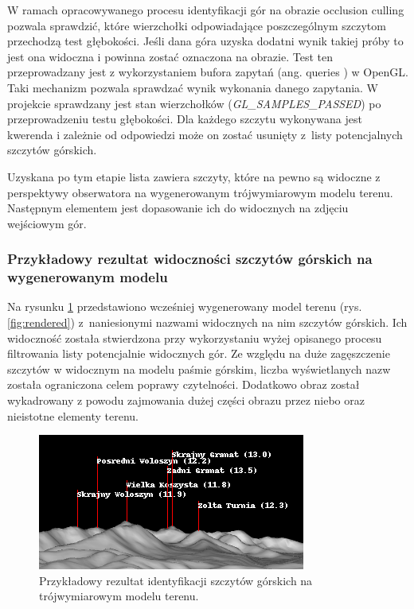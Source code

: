 \par

W ramach opracowywanego procesu identyfikacji gór na obrazie occlusion culling pozwala sprawdzić, które wierzchołki odpowiadające poszczególnym szczytom przechodzą test głębokości. Jeśli dana góra uzyska dodatni wynik takiej próby to jest ona widoczna i powinna zostać oznaczona na obrazie. Test ten przeprowadzany jest z wykorzystaniem bufora zapytań (ang. queries \cite{queries_opengl}) w OpenGL. Taki mechanizm pozwala sprawdzać wynik wykonania danego zapytania. W projekcie sprawdzany jest stan wierzchołków (\textit{GL\_SAMPLES\_PASSED}) po przeprowadzeniu testu głębokości. Dla każdego szczytu wykonywana jest kwerenda i zależnie od odpowiedzi może on zostać usunięty z~listy potencjalnych szczytów górskich.

\par

Uzyskana po tym etapie lista zawiera szczyty, które na pewno są widoczne z perspektywy obserwatora na wygenerowanym trójwymiarowym modelu terenu. Następnym elementem jest dopasowanie ich do widocznych na zdjęciu wejściowym gór.


\subsubsection{Przykładowy rezultat widoczności szczytów górskich na wygenerowanym modelu}

Na rysunku \ref{fig:render_annotated} przedstawiono wcześniej wygenerowany model terenu (rys. \ref{fig:rendered}) z~naniesionymi nazwami widocznych na nim szczytów górskich. Ich widoczność została stwierdzona przy wykorzystaniu wyżej opisanego procesu filtrowania listy potencjalnie widocznych gór. Ze względu na duże zagęszczenie szczytów w widocznym na modelu paśmie górskim, liczba wyświetlanych nazw została ograniczona celem poprawy czytelności.  Dodatkowo obraz został wykadrowany z powodu zajmowania dużej części obrazu przez niebo oraz nieistotne elementy terenu.

\begin{figure}[!h]
    \centering \includegraphics[width=0.75\linewidth]{img/render_annotated.png}
    \caption{Przykładowy rezultat identyfikacji szczytów górskich na trójwymiarowym modelu terenu.}
    \label{fig:render_annotated}
\end{figure}


